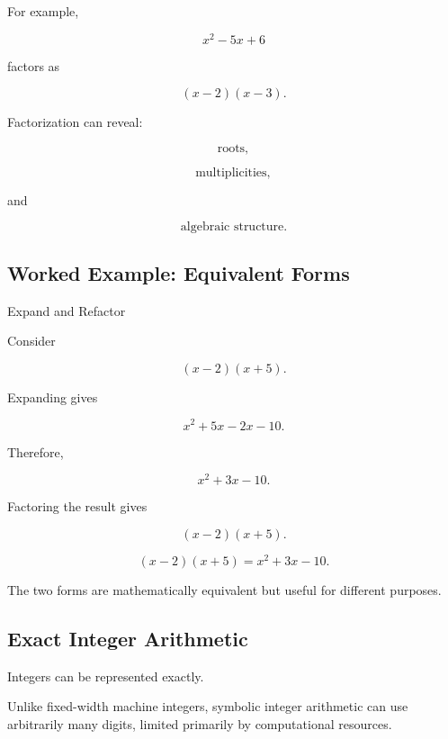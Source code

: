 For example,

\[
x^2-5x+6
\]

factors as

\[
\boxed{
(x-2)(x-3).
}
\]

Factorization can reveal:

\[
\boxed{
\text{roots},
}
\]

\[
\boxed{
\text{multiplicities},
}
\]

and

\[
\boxed{
\text{algebraic structure}.
}
\]

\subsection{Worked Example: Equivalent Forms}
\label{subsec:worked-symbolic-equivalent-forms}

\begin{workedexamplebox}{Expand and Refactor}

Consider

\[
(x-2)(x+5).
\]

Expanding gives

\[
x^2+5x-2x-10.
\]

Therefore,

\[
x^2+3x-10.
\]

Factoring the result gives

\[
(x-2)(x+5).
\]

\begin{answerbox}
\[
\boxed{
(x-2)(x+5)
=
x^2+3x-10.
}
\]
\end{answerbox}

The two forms are mathematically equivalent but useful for different
purposes.

\end{workedexamplebox}

\subsection{Exact Integer Arithmetic}
\label{subsec:exact-integer-arithmetic}

Integers can be represented exactly.

Unlike fixed-width machine integers, symbolic integer arithmetic can use
arbitrarily many digits, limited primarily by computational resources.

